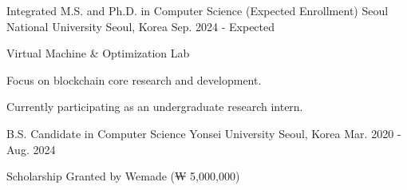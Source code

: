 


\begin{cventries}


\cventry
{Integrated M.S. and Ph.D. in Computer Science (Expected Enrollment)} %
{Seoul National University} %
{Seoul, Korea} %
{Sep. 2024 - Expected} %
{ %
\begin{cvitems}
\item {Virtual Machine \& Optimization Lab}
\item {Focus on blockchain core research and development.}
\item {Currently participating as an undergraduate research intern.}
\end{cvitems}
}

\cventry
{B.S. Candidate in Computer Science} %
{Yonsei University} %
{Seoul, Korea} %
{Mar. 2020 - Aug. 2024} %
{ %
\begin{cvitems}
\item {Scholarship Granted by Wemade (₩ 5,000,000)}
\end{cvitems}
}


\end{cventries}